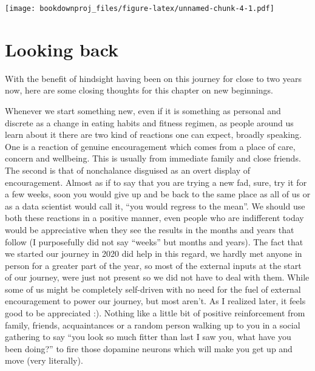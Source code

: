 \documentclass[
  oneside]{book}
\begin{document}
\texttt{[image: bookdownproj\_files/figure-latex/unnamed-chunk-4-1.pdf]}

\hypertarget{looking-back}{%
\section{Looking back}\label{looking-back}}

With the benefit of hindsight having been on this journey for close to two years now, here are some closing thoughts for this chapter on new beginnings.

Whenever we start something new, even if it is something as personal and discrete as a change in eating habits and fitness regimen, as people around us learn about it there are two kind of reactions one can expect, broadly speaking. One is a reaction of genuine encouragement which comes from a place of care, concern and wellbeing. This is usually from immediate family and close friends. The second is that of nonchalance disguised as an overt display of encouragement. Almost as if to say that you are trying a new fad, sure, try it for a few weeks, soon you would give up and be back to the same place as all of us or as a data scientist would call it, ``you would regress to the mean''. We should use both these reactions in a positive manner, even people who are indifferent today would be appreciative when they see the results in the months and years that follow (I purposefully did not say ``weeks'' but months and years). The fact that we started our journey in 2020 did help in this regard, we hardly met anyone in person for a greater part of the year, so most of the external inputs at the start of our journey, were just not present so we did not have to deal with them. While some of us might be completely self-driven with no need for the fuel of external encouragement to power our journey, but most aren't. As I realized later, it feels good to be appreciated :). Nothing like a little bit of positive reinforcement from family, friends, acquaintances or a random person walking up to you in a social gathering to say ``you look so much fitter than last I saw you, what have you been doing?'' to fire those dopamine neurons which will make you get up and move (very literally).
\end{document}
